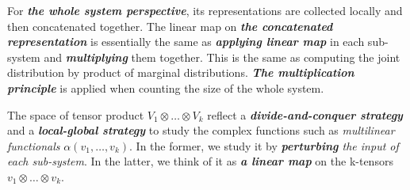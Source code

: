 \documentclass[11pt]{article}
\begin{document}
\begin{itemize}
\begin{remark}
For \emph{\textbf{the whole system perspective}}, its representations are collected locally and then concatenated together. The linear map on \emph{\textbf{the concatenated representation}} is essentially the same as \emph{\textbf{applying linear map}} in each sub-system and \emph{\textbf{multiplying}} them together. This is the same as computing the joint distribution by product of marginal distributions. \emph{\textbf{The multiplication principle}} is applied when counting the size of the whole system.

The space of tensor product $V_1\otimes \ldots \otimes V_k$ reflect a \emph{\textbf{divide-and-conquer strategy}} and a \emph{\textbf{local-global strategy}} to study the complex functions such as \emph{multilinear functionals} $\alpha(v_1, \ldots, v_k)$. In the former, we study it by \emph{\textbf{perturbing} the input of each sub-system}. In the latter, we think of it as \emph{\textbf{a linear map}} on the k-tensors $v_1 \otimes \ldots \otimes v_k$.
\end{remark}

\end{itemize}
\end{document}
